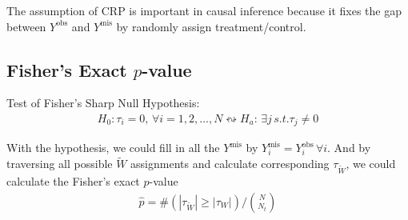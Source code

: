 The assumption of CRP is important in causal inference because it fixes the gap between $ Y^\mathrm{obs}  $ and $ Y^\mathrm{mis} $ by randomly assign treatment/control.


\subsection{Fisher's Exact $ p $-value}

Test of Fisher's Sharp Null Hypothesis:
\begin{align}
    H_0:\tau_i=0,\,\forall i=1,2,\ldots,N  \leftrightsquigarrow H_a:\,\exists j\,s.t. \tau_j\neq 0
\end{align}

With the hypothesis, we could fill in all the $ Y^\mathrm{mis}  $ by $ Y^\mathrm{mis}_i=Y^\mathrm{obs}_i   \,\forall i$. And by traversing all possible $ \tilde{W} $ assignments and calculate corresponding $ \tau_{\tilde{W}} $, we could calculate the Fisher's exact $ p $-value
\begin{align}
     \hat{p}={\#(|\tau_{\tilde{W}}|\geq |\tau_{W}|)}\bigg/\binom{N}{N_t}
\end{align}

